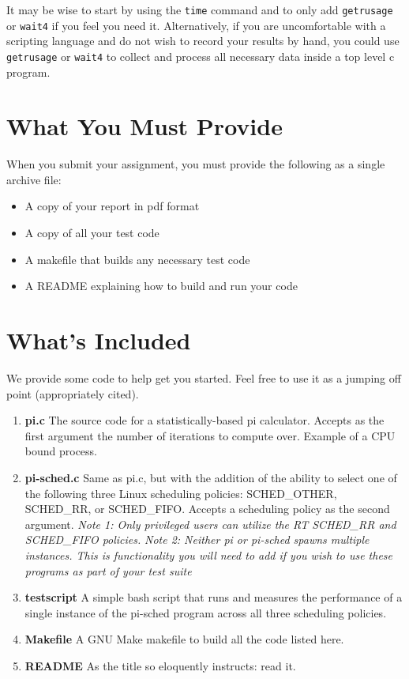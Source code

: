 \documentclass[12pt]{article}
\begin{document}
It may be wise to start by
using the \texttt{time} command and to only add \texttt{getrusage} or
\texttt{wait4} if you feel you need it. Alternatively, if you are
uncomfortable with a scripting language and do not wish to record your
results by hand, you could use \texttt{getrusage} or \texttt{wait4} to
collect and process all necessary data inside a top level c program.

\section{What You Must Provide}

When you submit your assignment, you must provide the following as a
single archive file:
\begin{itemize}
\item A copy of your report in pdf format
\item A copy of all your test code
\item A makefile that builds any necessary test code
\item A README explaining how to build and run your code
\end{itemize}

\section{What's Included}

We provide some code to help get you started. Feel free to use it as a
jumping off point (appropriately cited).

\begin{enumerate}

\item {\bf pi.c} The source code for a statistically-based pi
  calculator. Accepts as the first argument the number of iterations to
  compute over. Example of a CPU bound process.

\item {\bf pi-sched.c} Same as pi.c, but with the addition of the
  ability to select one of the following three Linux scheduling
  policies: SCHED\_OTHER, SCHED\_RR, or SCHED\_FIFO. Accepts a scheduling
  policy as the second argument.
\emph{Note 1: Only privileged users can
  utilize the RT SCHED\_RR and SCHED\_FIFO policies.}
\emph{Note 2:
    Neither pi or pi-sched spawns multiple instances. This is
    functionality you will need to add if you wish to use these
    programs as part of your test suite}

\item {\bf testscript} A simple bash script that runs and measures the
  performance of a single instance of the pi-sched program across all
  three scheduling policies.

\item {\bf Makefile} A GNU Make makefile to build all the code listed
  here.

\item {\bf README} As the title so eloquently instructs: read it.

\end{enumerate}
\end{document}
